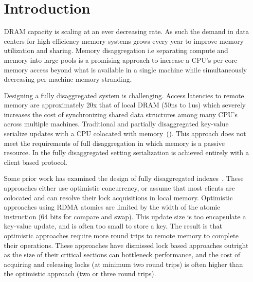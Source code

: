 \section{Introduction}
\label{sec:intro}

DRAM capacity is scaling at an ever decreasing rate. As such
the demand in data centers for high efficiency memory
systems grows every year to improve memory utilization and
sharing. Memory disaggregation i.e separating compute and
memory into large pools is a promising approach to increase
a CPU's per core memory access beyond what is available in a
single machine while simultaneously decreasing per machine
memory stranding.

Designing a fully disaggregated system is challenging.
Access latencies to remote memory are approximately 20x that
of local DRAM (50ns to 1us) which severely increases the
cost of synchronizing shared data structures among many
CPU's across multiple machines. Traditional and partially
disaggregated key-value serialize updates with a CPU
colocated with
memory~\cite{memcached,herd,erpc,pilaf,cell,clover}(). This approach does not meet the requirements of
full disaggregation in which memory is a passive resource.
In the fully disaggregated setting serialization is achieved
entirely with a client based protocol. 

Some prior work has examined the design of fully
disaggregated indexes~\cite{sherman, race, fusee, rolex}.
These approaches either use optimistic concurrency, or
assume that most clients are colocated and can resolve their
lock acquisitions in local memory. Optimistic approaches
using RDMA atomics are limited by the width of the atomic
instruction (64 bits for compare and swap). This update size
is too encapsulate a key-value update, and is often too
small to store a key. The result is that optimistic
approaches require more round trips to remote memory to
complete their operations. These approaches have dismissed
lock based approaches outright as the size of their critical
sections can bottleneck performance, and  the cost of
acquiring and releasing locks (at minimum two round trips)
is often higher than the optimistic approach (two or three
round trips).


